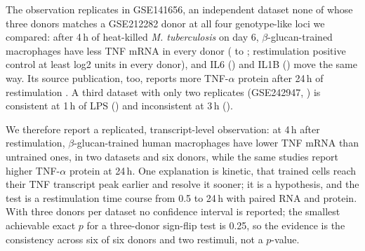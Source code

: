 The observation replicates in GSE141656, an independent dataset none of whose three donors
matches a GSE212282 donor at all four genotype-like loci we compared: after 4\,h of heat-killed \emph{M. tuberculosis}
on day 6, $\beta$-glucan-trained macrophages have less TNF mRNA in every donor
( to ; restimulation positive control at least
 log2 units in every donor), and IL6 () and
IL1B () move the same way. Its source publication, too, reports more
TNF-$\alpha$ protein after 24\,h of restimulation \citep{moorlag2020}. A third dataset with
only two replicates (GSE242947, \citealp{cheng2024dectin}) is consistent at 1\,h of LPS
() and inconsistent at 3\,h ().

We therefore report a replicated, transcript-level observation: at 4\,h after
restimulation, $\beta$-glucan-trained human macrophages have lower TNF mRNA than untrained
ones, in two datasets and six donors, while the same studies report higher TNF-$\alpha$
protein at 24\,h. One explanation is kinetic, that trained cells reach their TNF transcript
peak earlier and resolve it sooner; it is a hypothesis, and the test is a restimulation time
course from 0.5 to 24\,h with paired RNA and protein. With three donors per dataset no
confidence interval is reported; the smallest achievable exact $p$ for a three-donor
sign-flip test is 0.25, so the evidence is the consistency across six of six donors and two
restimuli, not a $p$-value.
